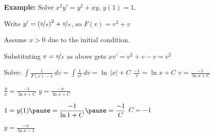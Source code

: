 \documentclass[10pt,aspectratio=169]{beamer}
\begin{document}
\begin{frame}

\textbf{Example:}
Solve 
\quad
$x^2y' = y^2+xy$, \quad $y(1)=1$.

\pause
\medskip

Write $y'= {\left(\nicefrac{y}{x}\right)}^2+\nicefrac{y}{x}$,
\quad so $F(v) = v^2+v$

\pause
\medskip

Assume $x > 0$ due to the initial condition.

\medskip
\pause

Substituting \quad $v=\nicefrac{y}{x}$ \quad as above gets \quad
$xv' = v^2+v-v = v^2$

\medskip
\pause

Solve:
\quad
$\displaystyle
\int \frac{1}{F(v)-v} \,dv =
\int \frac{1}{v^2} \,dv = \ln \, \lvert x \rvert + C$
\pause
\wthus
$\displaystyle
\frac{-1}{v} = \ln  x  + C$
\pause
\wthus
$\displaystyle
v = \frac{-1}{\ln  x  + C}$

\medskip
\pause

\wthus
$\displaystyle
\frac{y}{x} = \frac{-1}{\ln  x  + C}$
\pause
\wthus
$\displaystyle
y = \frac{-x}{\ln  x  + C}$

\medskip
\pause

$1 = y(1)
\pause
= \dfrac{-1}{\ln  1  + C}
\pause
= \dfrac{-1}{C}$
\pause
\wthus
$C = -1$

\medskip
\pause

\wthus
$\displaystyle
y = \frac{-x}{\ln  x  -1}$
\end{frame}
\end{document}
